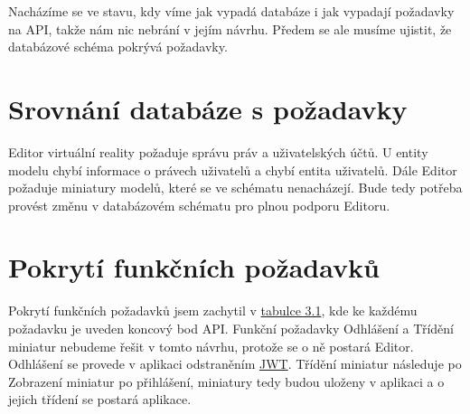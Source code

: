 \documentclass[thesis=B,czech]{FITthesis}[2012/06/26]
\begin{document}
    Nacházíme se ve stavu, kdy víme jak vypadá databáze i jak vypadají požadavky na API, takže nám nic nebrání v jejím návrhu. Předem se ale musíme ujistit, že databázové schéma pokrývá požadavky.
    
    \section{Srovnání databáze s požadavky}
        Editor virtuální reality požaduje správu práv a uživatelských účtů. U entity modelu chybí informace o právech uživatelů a chybí entita uživatelů. Dále Editor požaduje miniatury modelů, které se ve schématu nenacházejí. Bude tedy potřeba provést změnu v databázovém schématu pro plnou podporu Editoru.

    \section{Pokrytí funkčních požadavků}
        Pokrytí funkčních požadavků jsem zachytil v \hyperref[tab:tabulkaPokryti]{tabulce 3.1}, kde ke každému požadavku je uveden koncový bod API. Funkční požadavky Odhlášení a Třídění miniatur nebudeme řešit v tomto návrhu, protože se o ně postará Editor.
        Odhlášení se provede v aplikaci odstraněním \hyperref[sec:jwt]{JWT}.
        Třídění miniatur následuje po Zobrazení miniatur po přihlášení, miniatury tedy budou uloženy v aplikaci a o jejich třídení se postará aplikace.
    
\end{document}
